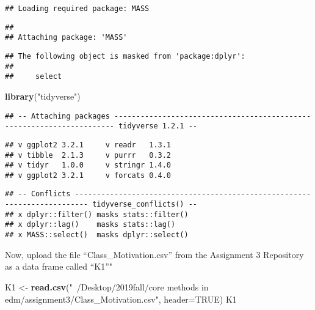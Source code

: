 \documentclass[]{article}
\newenvironment{Shaded}{\begin{snugshade}}{\end{snugshade}}
\newcommand{\DataTypeTok}[1]{\textcolor[rgb]{0.13,0.29,0.53}{#1}}
\newcommand{\KeywordTok}[1]{\textcolor[rgb]{0.13,0.29,0.53}{\textbf{#1}}}
\newcommand{\NormalTok}[1]{#1}
\newcommand{\OtherTok}[1]{\textcolor[rgb]{0.56,0.35,0.01}{#1}}
\newcommand{\StringTok}[1]{\textcolor[rgb]{0.31,0.60,0.02}{#1}}
\begin{document}
\begin{verbatim}
## Loading required package: MASS
\end{verbatim}

\begin{verbatim}
## 
## Attaching package: 'MASS'
\end{verbatim}

\begin{verbatim}
## The following object is masked from 'package:dplyr':
## 
##     select
\end{verbatim}

\begin{Shaded}
\begin{Highlighting}[]
\KeywordTok{library}\NormalTok{(}\StringTok{"tidyverse"}\NormalTok{)}
\end{Highlighting}
\end{Shaded}

\begin{verbatim}
## -- Attaching packages ---------------------------------------------------------------------- tidyverse 1.2.1 --
\end{verbatim}

\begin{verbatim}
## v ggplot2 3.2.1     v readr   1.3.1
## v tibble  2.1.3     v purrr   0.3.2
## v tidyr   1.0.0     v stringr 1.4.0
## v ggplot2 3.2.1     v forcats 0.4.0
\end{verbatim}

\begin{verbatim}
## -- Conflicts ------------------------------------------------------------------------- tidyverse_conflicts() --
## x dplyr::filter() masks stats::filter()
## x dplyr::lag()    masks stats::lag()
## x MASS::select()  masks dplyr::select()
\end{verbatim}

Now, upload the file ``Class\_Motivation.csv'' from the Assignment 3
Repository as a data frame called ``K1''"

\begin{Shaded}
\begin{Highlighting}[]
\NormalTok{K1 <-}\StringTok{ }\KeywordTok{read.csv}\NormalTok{(}\StringTok{"~/Desktop/2019fall/core methods in edm/assignment3/Class_Motivation.csv"}\NormalTok{, }\DataTypeTok{header=}\OtherTok{TRUE}\NormalTok{)}
\NormalTok{K1}
\end{Highlighting}
\end{Shaded}
\end{document}
